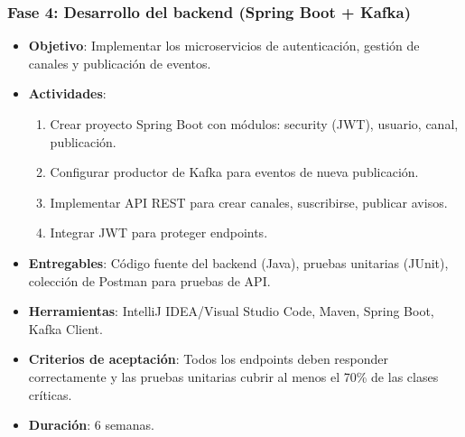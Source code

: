 \subsubsection{Fase 4: Desarrollo del backend (Spring Boot + Kafka)}
\begin{itemize}
    \item \textbf{Objetivo}: Implementar los microservicios de autenticación, gestión de canales y publicación de eventos.
    \item \textbf{Actividades}:
        \begin{enumerate}
            \item Crear proyecto Spring Boot con módulos: security (JWT), usuario, canal, publicación.
            \item Configurar productor de Kafka para eventos de nueva publicación.
            \item Implementar API REST para crear canales, suscribirse, publicar avisos.
            \item Integrar JWT para proteger endpoints.
        \end{enumerate}
    \item \textbf{Entregables}: Código fuente del backend (Java), pruebas unitarias (JUnit), colección de Postman para pruebas de API.
    \item \textbf{Herramientas}: IntelliJ IDEA/Visual Studio Code, Maven, Spring Boot, Kafka Client.
    \item \textbf{Criterios de aceptación}: Todos los endpoints deben responder correctamente y las pruebas unitarias cubrir al menos el 70\% de las clases críticas.
    \item \textbf{Duración}: 6 semanas.
\end{itemize}

